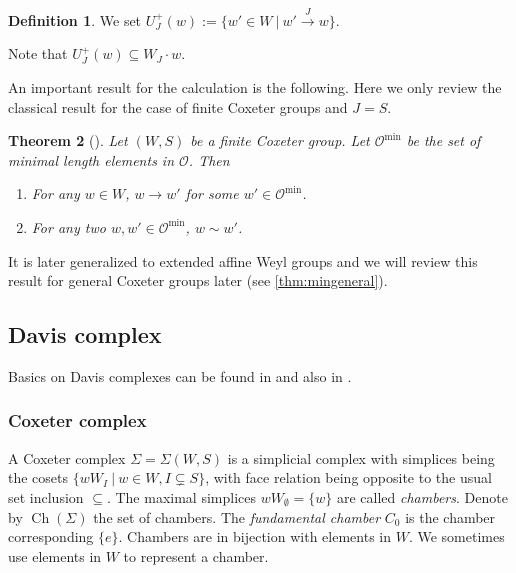 \documentclass[a4paper, reqno, 14pt]{amsart}
\def\subset{\subseteq}
\def\co{\mathcal{O}}
\def\ch{\mathcal{H}}
\DeclareMathOperator{\Ch}{Ch}
\newtheorem{thm}{Theorem}[section]
\theoremstyle{definition}
\newtheorem{defn}[thm]{Definition}
\theoremstyle{remark}
\numberwithin{equation}{section}
\numberwithin{thm}{section}
\begin{document}


\begin{defn} We set
    $U^+_J(w):=\{w'\in W \ | \ w'\xrightarrow{J} w\}.$
\end{defn}
Note that $U^+_J(w)\subset W_J\cdot w$.

An important result for the calculation is the following. Here we only review the classical result for the case of finite Coxeter groups and $J=S$. 

\begin{thm}[\cite{geck1993irreducible}]\label{thm:minimal_thm_finite}
    Let $(W,S)$ be a finite Coxeter group. Let $\co^{\min}$ be the set of minimal length elements in $\co$. Then
    \begin{enumerate}
        \item For any $w\in W$, $w\rightarrow w'$ for some $w'\in\co^{\min}$.
        \item For any two $w,w'\in\co^{\min}$, $w\sim w'$.
    \end{enumerate}
\end{thm}
It is later generalized to extended affine Weyl groups \cite{he2014minimal} and we will review this result for general Coxeter groups later (see \cref{thm:mingeneral}).

\subsection{Davis complex}
Basics on Davis complexes can be found in \cite{davis1994buildings,davis2008geometry} and also in \cite{marquis2020structure}.
\subsubsection{Coxeter complex}
A Coxeter complex $\Sigma=\Sigma(W,S)$ is a simplicial complex with simplices being the cosets $\{wW_I\ |\ w\in W,I\subsetneq S \}$, with face relation being opposite to the usual set inclusion $\subset$. The maximal simplices $wW_\emptyset=\{w\}$ are called \emph{chambers}. Denote by $\Ch(\Sigma)$ the set of chambers. The \emph{fundamental chamber} $C_0$ is the chamber corresponding $\{e\}$. Chambers are in bijection with elements in $W$. We sometimes use elements in $W$ to represent a chamber.
\end{document}

